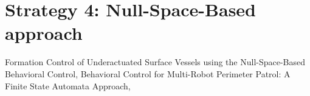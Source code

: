 \section{Strategy 4: Null-Space-Based approach}
Formation Control of Underactuated Surface Vessels using the Null-Space-Based Behavioral Control,
Behavioral Control for Multi-Robot Perimeter Patrol: A Finite State Automata Approach, 
